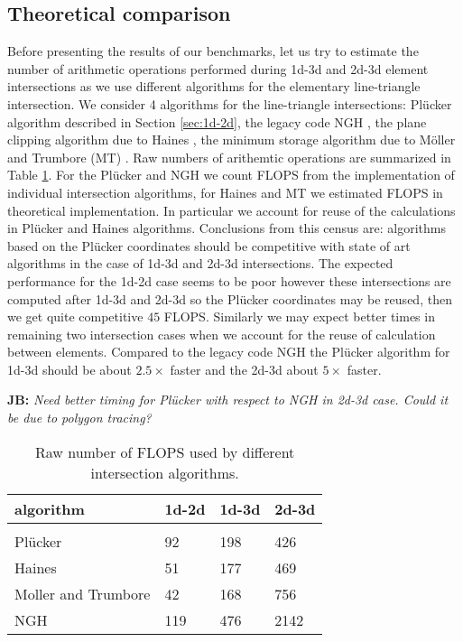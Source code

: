 \documentclass{elsarticle}
\newcommand{\noteJB}[1]{{\color{Blue} \textbf{JB: } \textit{#1}}}
\newcommand{\plucker}{Pl\"{u}cker }
\newcommand{\ngh}{NGH }
\begin{document}
\subsection{Theoretical comparison}
Before presenting the results of our benchmarks, let us try to estimate the number of arithmetic operations performed during 1d-3d and 2d-3d element intersections
as we use different algorithms for the elementary line-triangle intersection. We consider 4 algorithms for the line-triangle intersections: \plucker algorithm 
described in Section \ref{sec:1d-2d}, the legacy code \ngh, the plane clipping algorithm due to Haines \cite{haines_fast_1991}, the minimum storage
algorithm due to Möller and Trumbore (MT) \cite{moller_fast_1997}. Raw numbers of arithemtic operations are summarized in Table \ref{tab:fundamental_flops}.
For the \plucker and \ngh we count FLOPS from the implementation of individual intersection algorithms, for Haines and MT we estimated FLOPS in theoretical 
implementation. In particular we account for reuse of the calculations in \plucker and Haines algorithms. Conclusions from this census are:
algorithms based on the \plucker coordinates should be competitive with state of art algorithms in the case of 1d-3d and 2d-3d intersections. The expected performance
for the 1d-2d case seems to be poor however these intersections are computed after 1d-3d and 2d-3d so the \plucker coordinates may be reused, then we get 
quite competitive $45$ FLOPS. Similarly we may expect better times in remaining two intersection cases when we account for the reuse of calculation between elements.
Compared to the legacy code \ngh the \plucker algorithm for 1d-3d should be about $2.5\times$ faster and the 2d-3d about $5\times$ faster.

\noteJB{Need better timing for \plucker with respect to NGH in 
2d-3d  case. Could it be due to polygon tracing?}

\begin{table}[!htb]
    \caption{Raw number of FLOPS used by different intersection algorithms.}    
    \label{tab:fundamental_flops}
    \centering
    \renewcommand{\arraystretch}{1.2}
    \begin{tabular}[b]{l|lll}
            algorithm           & 1d-2d         & 1d-3d         & 2d-3d \\                      
            \hline\\
            \plucker           & 92            & 198           & 426\\
            Haines              & 51            & 177           & 469\\
            Moller and Trumbore & 42            & 168           & 756\\
            \ngh                & 119           & 476           & 2142\\
    \end{tabular}
    
\end{table}
\end{document}

